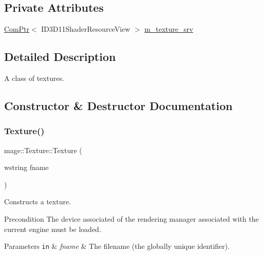 \subsection*{Private Attributes}
\begin{DoxyCompactItemize}
\item 
\hyperlink{namespacemage_ae74f374780900893caa5555d1031fd79}{Com\+Ptr}$<$ I\+D3\+D11\+Shader\+Resource\+View $>$ \hyperlink{classmage_1_1_texture_a8666bb39618e89e782c7cfeabebcc2b0}{m\+\_\+texture\+\_\+srv}
\end{DoxyCompactItemize}


\subsection{Detailed Description}
A class of textures. 

\subsection{Constructor \& Destructor Documentation}
\hypertarget{classmage_1_1_texture_a235e56cd6a3886daf11b0caa1d568da9}{}\label{classmage_1_1_texture_a235e56cd6a3886daf11b0caa1d568da9} 
\subsubsection{\texorpdfstring{Texture()}{Texture()}\hspace{0.1cm}{\footnotesize\ttfamily [1/6]}}
{\footnotesize\ttfamily mage\+::\+Texture\+::\+Texture (\begin{DoxyParamCaption}\item[{wstring}]{fname }\end{DoxyParamCaption})\hspace{0.3cm}{\ttfamily [explicit]}}

Constructs a texture.

\begin{DoxyPrecond}{Precondition}
The device associated of the rendering manager associated with the current engine must be loaded. 
\end{DoxyPrecond}

\begin{DoxyParams}[1]{Parameters}
\mbox{\tt in}  & {\em fname} & The filename (the globally unique identifier). \\
\hline
\end{DoxyParams}

